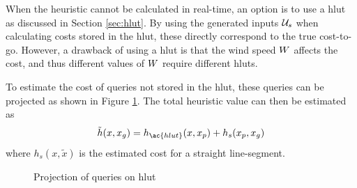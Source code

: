 When the heuristic cannot be calculated in real-time, an option is to use a \ac{hlut} as discussed in Section \ref{sec:hlut}. By using the generated 
inputs $\mathcal{U}_s$ when calculating costs stored in the \ac{hlut}, these directly correspond to the true cost-to-go. However, a drawback of 
using a \ac{hlut} is that the wind speed $W$ affects the cost, and thus different values of $W$ require different \acp{hlut}. 

To estimate the cost of queries not stored in the \ac{hlut}, these queries can be projected as shown in Figure \ref{fig:hlut_proj}. The total heuristic value can then be estimated as 
\begin{equation}
    \tilde{h}(x, x_g) = h_{\ac{hlut}}(x, x_p) + h_s(x_p, x_g)
\end{equation}
where $h_s(x, \tilde{x})$ is the estimated cost for a straight line-segment.
\begin{figure}
    \begin{center}
    \end{center}
    \caption{Projection of queries on \ac{hlut}}
    \label{fig:hlut_proj}
\end{figure}


